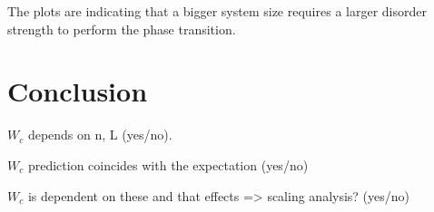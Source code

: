\documentclass[reprint,amsmath,amssymb,aps,prb]{revtex4-2}
\begin{document}
The plots are indicating that a bigger system size requires a larger disorder strength to perform the phase transition.


\section{Conclusion}%

$W_c$ depends on n, L (yes/no).

$W_c$ prediction coincides with the expectation (yes/no)

$W_c$ is dependent on these and that effects => scaling analysis? (yes/no)

\lipsum[2]%



\newpage
\appendix
\end{document}
